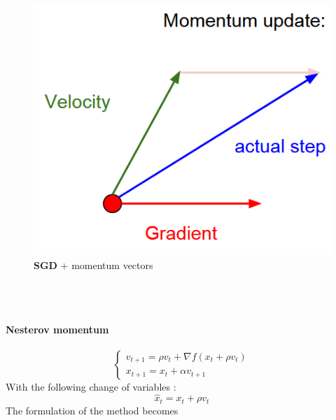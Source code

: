 \documentclass[11pt]{article}
\begin{document}
\begin{minipage}{0.5\textwidth}
\begin{figure} [H]
\centering 
\includegraphics[scale=0.58]{L613.pdf}
\caption{ \textbf{SGD} + momentum vectors}
\label{fig:L613}
\end{figure}
\end{minipage}\\\\
\paragraph{Nesterov momentum}
\begin{equation}
\begin{cases}{}
    v_{t+1}=\rho v_t+\nabla f(x_t+\rho v_t)\\
    x_{t+1}= x_t+\alpha v_{t+1}
    \end{cases}{}
\end{equation}{}
With the following change of variables :
\begin{equation}
    \hat{x}_{t}= x_t+\rho v_t
\end{equation}{}
The formulation of the method becomes
\end{document}
